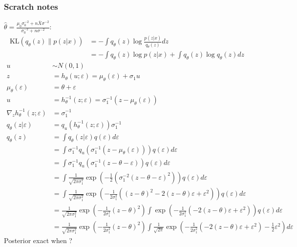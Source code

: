 \documentclass[10pt]{article}
\begin{document}
\subsubsection{Scratch notes}

$\hat{\theta}=\frac{\mu_0\sigma_0^{-2}+n\bar{X}\sigma^{-2}}{\sigma_0^{-2}+n\sigma^{-2}}$:
\begin{align*}
\mathrm{KL}(q_\theta(z)\|p(z|x)) &= - \int q_\theta(z)\log\frac{p(z|x)}{q_\theta(z)}dz \\
&= - \int q_\theta(z)\log p(z|x) + \int q_\theta(z)\log q_\theta(z)dz 
\end{align*}
\begin{align*}
u &\sim N(0,1) \\
z &= h_\theta(u;\varepsilon) = \mu_\theta(\varepsilon) + \sigma_1u \\
\mu_\theta(\varepsilon) &= \theta + \varepsilon \\
u &= h_\theta^{-1}(z;\varepsilon) = \sigma_1^{-1}(z-\mu_\theta(\varepsilon)) \\
\nabla_z h_\theta^{-1}(z;\varepsilon) &= \sigma_1^{-1} \\
q_\theta(z|\varepsilon) &= q_u(h_\theta^{-1}(z;\varepsilon))\sigma_1^{-1} \\
q_\theta(z) &= \int q_\theta(z|\varepsilon)q(\varepsilon)d\varepsilon \\
&= \int \sigma_1^{-1}q_u\left(\sigma_1^{-1}\left(z-\mu_\theta(\varepsilon)\right)\right)q(\varepsilon)d\varepsilon \\
&= \int \sigma_1^{-1}q_u\left(\sigma_1^{-1}\left(z-\theta-\varepsilon\right)\right)q(\varepsilon)d\varepsilon \\
&= \int \frac{1}{\sqrt{2\pi\sigma_1^2}}\exp\left(-\frac{1}{2}\left(\sigma_1^{-2}(z-\theta-\varepsilon)^2\right)\right)q(\varepsilon)d\varepsilon \\
&= \int \frac{1}{\sqrt{2\pi\sigma_1^2}}\exp\left(-\frac{1}{2\sigma_1^2}\left((z-\theta)^2-2(z-\theta)\varepsilon+\varepsilon^2\right)\right)q(\varepsilon)d\varepsilon \\
&= \frac{1}{\sqrt{2\pi\sigma_1^2}}\exp\left(-\frac{1}{2\sigma_1^2}(z-\theta)^2\right) \int \exp\left(-\frac{1}{2\sigma_1^2}\left(-2(z-\theta)\varepsilon+\varepsilon^2\right)\right)q(\varepsilon)d\varepsilon \\
&= \frac{1}{\sqrt{2\pi\sigma_1^2}}\exp\left(-\frac{1}{2\sigma_1^2}(z-\theta)^2\right) \int \frac{1}{\sqrt{2\pi}}\exp\left(-\frac{1}{2\sigma_1^2}\left(-2(z-\theta)\varepsilon+\varepsilon^2\right)-\frac{1}{2}\varepsilon^2\right)d\varepsilon
\end{align*}
Posterior exact when ?
\end{document}
